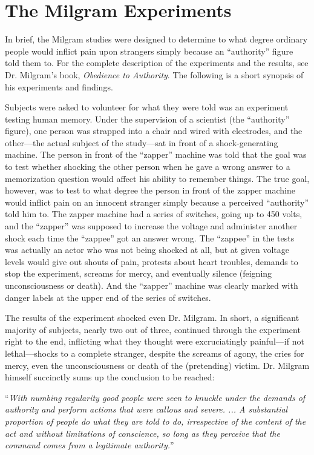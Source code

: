 \documentclass{book}
\begin{document}
\section{The Milgram Experiments}

In brief, the Milgram studies were designed to determine to what degree ordinary people would inflict pain upon strangers simply because an \enquote{authority} figure told them to. For the complete description of the experiments and the results, see Dr. Milgram's book, \emph{Obedience to Authority}. The following is a short synopsis of his experiments and findings.

Subjects were asked to volunteer for what they were told was an experiment testing human memory. Under the supervision of a scientist (the \enquote{authority} figure), one person was strapped into a chair and wired with electrodes, and the other---the actual subject of the study---sat in front of a shock-generating machine. The person in front of the \enquote{zapper} machine was told that the goal was to test whether shocking the other person when he gave a wrong answer to a memorization question would affect his ability to remember things. The true goal, however, was to test to what degree the person in front of the zapper machine would inflict pain on an innocent stranger simply because a perceived \enquote{authority} told him to. The zapper machine had a series of switches, going up to 450 volts, and the \enquote{zapper} was supposed to increase the voltage and administer another shock each time the \enquote{zappee} got an answer wrong. The \enquote{zappee} in the tests was actually an actor who was not being shocked at all, but at given voltage levels would give out shouts of pain, protests about heart troubles, demands to stop the experiment, screams for mercy, and eventually silence (feigning unconsciousness or death). And the \enquote{zapper} machine was clearly marked with danger labels at the upper end of the series of switches.

The results of the experiment shocked even Dr. Milgram. In short, a significant majority of subjects, nearly two out of three, continued through the experiment right to the end, inflicting what they thought were excruciatingly painful---if not lethal---shocks to a complete stranger, despite the screams of agony, the cries for mercy, even the unconsciousness or death of the (pretending) victim. Dr. Milgram himself succinctly sums up the conclusion to be reached:

\enquote{\emph{With numbing regularity good people were seen to knuckle under the demands of authority and perform actions that were callous and severe. ... A substantial proportion of people do what they are told to do, irrespective of the content of the act and without limitations of conscience, so long as they perceive that the command comes from a legitimate authority.}}
\end{document}
